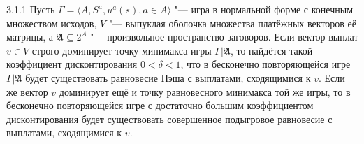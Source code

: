 \begin{theorem}{3.1.1}
	Пусть $\Gamma = \langle A, S^a, u^a(s), a \in A \rangle$ "--- игра в нормальной форме с конечным множеством исходов, $V$ "--- выпуклая оболочка множества платёжных векторов её матрицы, а $\mathfrak{A} \subseteq 2^A$ "--- произвольное пространство заговоров. Если вектор выплат $v \in V$ строго доминирует точку минимакса игры $\Gamma | \mathfrak{A}$, то найдётся такой коэффициент дисконтирования $0 < \delta < 1$, что в бесконечно повторяющейся игре $\Gamma | \mathfrak{A}$ будет существовать равновесие Нэша с выплатами, сходящимися к $v$. Если же вектор $v$ доминирует ещё и точку равновесного минимакса той же игры, то в бесконечно повторяющейся игре с достаточно большим коэффициентом дисконтирования будет существовать совершенное подыгровое равновесие с выплатами, сходящимися к $v$.
\end{theorem}

